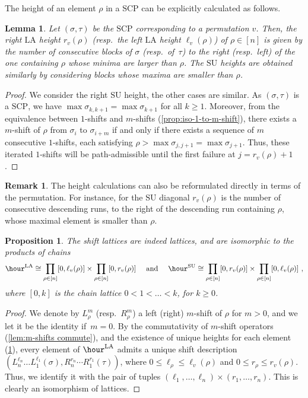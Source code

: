 \documentclass{amsart}
\newtheorem{proposition}[theorem]{Proposition}
\newtheorem{lemma}[theorem]{Lemma}
\theoremstyle{definition}
\newtheorem{remark}[theorem]{Remark}
\newcommand{\resp}{resp.~} %
\newcommand{\SU}{\mathrm{SU}}
\newcommand{\LA}{\mathrm{LA}}
\newcommand{\SCP}{\mathrm{SCP}}
\begin{document}
The height of an element $\rho$ in a $\SCP$ can be explicitly calculated as follows. 

\begin{lemma}
\label{prop:maximal m-shift formulae}
Let $(\sigma,\tau)$ be the $\SCP$ corresponding to a permutation $v$.
Then, the right $\LA$ height $r_v(\rho)$ (\resp the left $\LA$ height $\ell_v(\rho)$) of $\rho \in [n]$ is given by the number of consecutive blocks of $\sigma$ (\resp of~$\tau$) to the right (\resp left) of the one containing $\rho$ whose minima are larger than $\rho$.
The $\SU$ heights are obtained similarly by considering blocks whose maxima are smaller than $\rho$. 
\end{lemma}

\begin{proof}
We consider the right $\SU$ height, the other cases are similar. 
As $(\sigma,\tau)$ is a $\SCP$, we have $\max \sigma_{k,k+1} = \max \sigma_{k+1}$ for all $k\geq 1$. 
Moreover, from the equivalence between $1$-shifts and $m$-shifts (\cref{prop:iso-1-to-m-shift}), there exists a $m$-shift of $\rho$ from $\sigma_i$ to $\sigma_{i+m}$ if and only if there exists a sequence of $m$ consecutive $1$-shifts, each satisfying $\rho > \max \sigma_{j,j+1}=\max \sigma_{j+1}$.
Thus, these iterated $1$-shifts will be path-admissible until the first failure at $j=r_v(\rho)+1$.
\end{proof}

\begin{remark}
The height calculations can also be reformulated directly in terms of the permutation.
For instance, for the $\SU$ diagonal $r_v(\rho)$ is the number of consecutive descending runs, to the right of the descending run containing $\rho$, whose maximal element is smaller than $\rho$.
\end{remark}

\begin{proposition} 
\label{prop:shift lattice}
The shift lattices are indeed lattices, and are isomorphic to the products of chains
\begin{align*}
\hour^\LA \cong \prod_{\rho \in [n]} [0,\ell_v(\rho)] \times \prod_{\rho \in [n]} [0,r_v(\rho)]
\quad \text{ and } \quad
\hour^\SU \cong \prod_{\rho \in [n]} [0,r_v(\rho)] \times \prod_{\rho \in [n]} [0,\ell_v(\rho)] \ ,
\end{align*}
where $[0,k]$ is the chain lattice $0<1<\dots<k$, for $k\geq 0$.
\end{proposition}

\begin{proof}
We denote by $L_\rho^m$ (\resp $R_\rho^m$) a left (right) $m$-shift of $\rho$ for $m>0$, and we let it be the identity if~$m=0$.
By the commutativity of $m$-shift operators (\cref{lem:m-shifts commute}), and the existence of unique heights for each element (\cref{prop:maximal m-shift formulae}), every element of $\hour^\LA$ admits a unique shift description $(L^{\ell_n}_{n} \dots L^{\ell_1}_{1}(\sigma),
R^{r_n}_{n}\cdots R^{r_{1}}_{1}(\tau))$, where $0\leq \ell_\rho\leq \ell_v(\rho)$ and $0\leq r_\rho\leq r_v(\rho)$.
Thus, we identify it with the pair of tuples $(\ell_1,\ldots,\ell_n)\times (r_1,\ldots,r_n)$.
This is clearly an isomorphism of lattices.
\end{proof}
\end{document}
